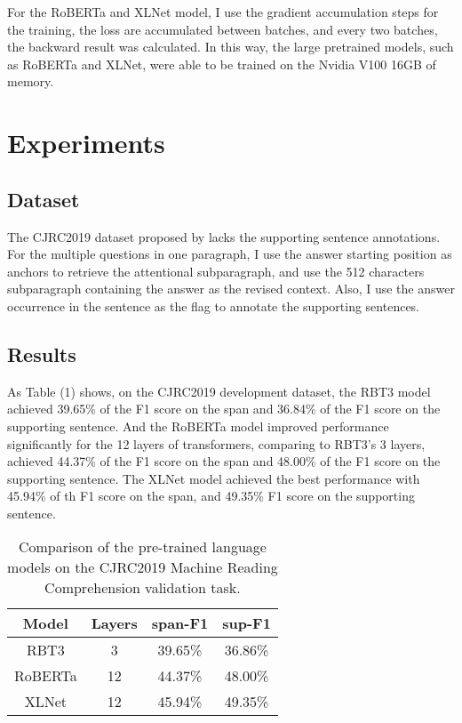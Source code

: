 \documentclass[11pt,a4paper]{article}
\begin{document}
For the RoBERTa and XLNet model, I use the gradient accumulation steps for the training, the loss are accumulated between batches,
and every two batches, the backward result was calculated.
In this way, the large pretrained models, such as RoBERTa and XLNet, were able to be trained on the Nvidia V100 16GB of memory.

\section{Experiments}

\subsection{Dataset}

 The CJRC2019 dataset proposed by \citet{duan2019cjrc} lacks the supporting sentence annotations.
For the multiple questions in one paragraph, I use the answer starting position as anchors to retrieve
the attentional subparagraph, and use the 512 characters subparagraph containing the answer as the revised context.
Also, I use the answer occurrence in the sentence as the flag to annotate the supporting sentences.

\subsection{Results}


As Table (1) shows, on the CJRC2019 development dataset, the RBT3 model achieved 39.65\% of the F1 score on the span and 36.84\% of the F1 score on the supporting sentence.
And the RoBERTa model improved performance significantly for the 12 layers of transformers, comparing to RBT3's 3 layers,
achieved 44.37\% of the F1 score on the span and 48.00\% of the F1 score on the supporting sentence.
The XLNet model achieved the best performance with 45.94\% of th F1 score on the span, and 49.35\% F1 score on the supporting sentence.


\begin{table}
\centering
\begin{tabular}{cccc}
\hline
\textbf{Model} & \textbf{Layers}& \textbf{span-F1} & \textbf{sup-F1} \\
\hline
RBT3 & 3 & 39.65\% & 36.86\% \\
RoBERTa & 12 & 44.37\% & 48.00\% \\
XLNet & 12 & 45.94\% & 49.35\% \\
\hline
\end{tabular}
\caption{Comparison of the pre-trained language models on the CJRC2019 Machine Reading Comprehension validation task.}
\end{table}
\end{document}
